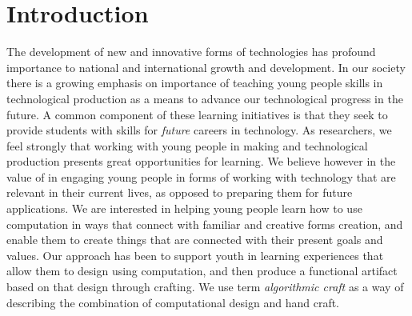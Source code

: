 \documentclass{sigchi}
\begin{document}


\section{Introduction}
The development of new and innovative forms of technologies has profound importance to national and international growth and development. In our society there is a growing emphasis on importance of teaching young people skills in technological production as a means to advance our technological progress in the future. A common component of these learning initiatives is that they seek to provide students with skills for \textit{future} careers in technology. %
As researchers, we feel strongly that working with young people in making and technological production presents great opportunities for learning. We believe however in the value of in engaging young people in forms of working with technology that are relevant in their current lives, as opposed to preparing them for future applications. We are interested in helping young people learn how to use computation in ways that connect with familiar and creative forms creation, and enable them to create things that are connected with their present goals and values. Our approach has been to support youth in learning experiences that allow them to design using computation, and then produce a functional artifact based on that design through crafting. We use term \textit{algorithmic craft} as a way of describing the combination of computational design and hand craft. 
\end{document}
